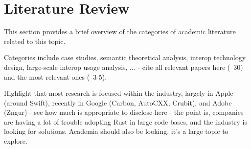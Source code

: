 \section{Literature Review}
\label{sec:academic_background}

This section provides a brief overview of the categories of academic literature related to this topic.

Categories include case studies, semantic theoretical analysis, interop technology design, large-scale interop usage analysis, ... - cite all relevant papers here (~30) and the most relevant ones (~3-5).

Highlight that most research is focused within the industry, largely in Apple (around Swift), recently in Google (Carbon, AutoCXX, Crubit), and Adobe (Zngur) - see how much is appropriate to disclose here - the point is, companies are having a lot of trouble adopting Rust in large code bases, and the industry is looking for solutions. Academia should also be looking, it's a large topic to explore.
